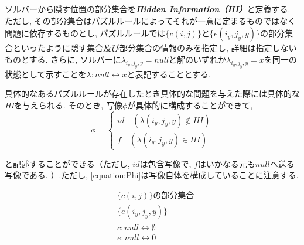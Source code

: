 \begin{definition}\label{definition:HiddenInformation}
  ソルバーから隠す位置の部分集合を\textbf{\textit{Hidden Information（HI）}}と定義する.
  ただし, その部分集合はパズルルールによってそれが一意に定まるものではなく問題に依存するものとし, パズルルールでは$\{c(i,j)\}$と$\{e(i_y,j_y,y)\}$の部分集合といったように隠す集合及び部分集合の情報のみを指定し, 詳細は指定しないものとする.
  さらに, ソルバーに$\lambda_{i_y,j_y,y}=\textit{null}$と解のいずれか$\lambda_{i_y,j_y,y}=x$を同一の状態として示すことを$\lambda\colon\textit{null}\leftrightarrow x$と表記することとする.

\end{definition}
具体的なあるパズルルールが存在したとき具体的な問題を与えた際には具体的な\textit{HI}を与えられる. そのとき, 写像$\phi$が具体的に構成することができて,
\begin{equation}\label{equation:Phi}
  \phi=
  \begin{cases}
    {id \quad (\lambda(i_y,j_y,y) \not\in HI)} \\
    {f \quad (\lambda(i_y,j_y,y) \in HI)}
  \end{cases}
\end{equation}

と記述することができる（ただし, $id$は包含写像で, $f$はいかなる元も$null$へ送る写像である. ）.ただし, \cref{equation:Phi}は写像自体を構成していることに注意する.

\begin{example}\label{example:SlitherLinkHiddenInformation}
  \begin{align}
     & \{c(i,j)\}の部分集合                              \\
     & \{e(i_y,j_y,y)\}                             \\
     & c\colon\textit{null}\leftrightarrow\emptyset \\
     & e\colon\textit{null}\leftrightarrow 0
  \end{align}
\end{example}

